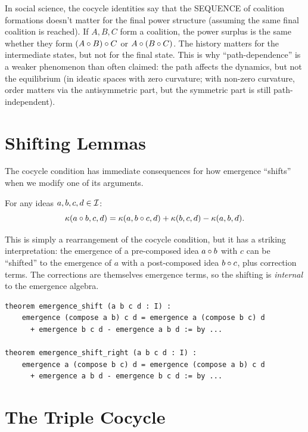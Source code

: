 \begin{interpretation}
In social science, the cocycle identities say that the SEQUENCE of coalition
formations doesn't matter for the final power structure (assuming the same final
coalition is reached). If $A, B, C$ form a coalition, the power surplus is the
same whether they form $(A \circ B) \circ C$ or $A \circ (B \circ C)$.
The history matters for the intermediate states, but not for the final state.
This is why ``path-dependence'' is a weaker phenomenon than often claimed: the
path affects the dynamics, but not the equilibrium (in ideatic spaces with zero
curvature; with non-zero curvature, order matters via the antisymmetric part,
but the symmetric part is still path-independent).
\end{interpretation}


\section{Shifting Lemmas}

The cocycle condition has immediate consequences for how emergence ``shifts''
when we modify one of its arguments.

\begin{theorem}
\label{thm:emergence-shift}
For any ideas $a, b, c, d \in \mathcal{I}$:
\[
  \kappa(a \circ b, c, d) = \kappa(a, b \circ c, d) + \kappa(b, c, d) - \kappa(a, b, d).
\]
\end{theorem}

This is simply a rearrangement of the cocycle condition, but it has a
striking interpretation: the emergence of a pre-composed idea $a \circ b$
with $c$ can be ``shifted'' to the emergence of $a$ with a post-composed
idea $b \circ c$, plus correction terms. The corrections are themselves
emergence terms, so the shifting is \emph{internal} to the emergence algebra.

\begin{lstlisting}[caption={Shifting lemmas (IDT\_v3\_Emergence.lean)}]
theorem emergence_shift (a b c d : I) :
    emergence (compose a b) c d = emergence a (compose b c) d
      + emergence b c d - emergence a b d := by ...

theorem emergence_shift_right (a b c d : I) :
    emergence a (compose b c) d = emergence (compose a b) c d
      + emergence a b d - emergence b c d := by ...
\end{lstlisting}


\section{The Triple Cocycle}

